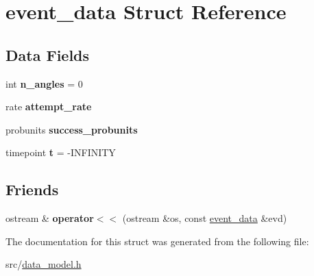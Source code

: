 \hypertarget{structevent__data}{}\section{event\+\_\+data Struct Reference}
\label{structevent__data}
\subsection*{Data Fields}
\begin{DoxyCompactItemize}
\item 
int {\bfseries n\+\_\+angles} = 0\hypertarget{structevent__data_a4ac8163657589d149ed034f321b61ce9}{}\label{structevent__data_a4ac8163657589d149ed034f321b61ce9}

\item 
rate {\bfseries attempt\+\_\+rate}\hypertarget{structevent__data_aa12da1e46a4e8e401433e90fd97fc015}{}\label{structevent__data_aa12da1e46a4e8e401433e90fd97fc015}

\item 
probunits {\bfseries success\+\_\+probunits}\hypertarget{structevent__data_ae13f0249bae2966da48518074f2b3495}{}\label{structevent__data_ae13f0249bae2966da48518074f2b3495}

\item 
timepoint {\bfseries t} = -\/I\+N\+F\+I\+N\+I\+TY\hypertarget{structevent__data_aa2f4362fb8d987420d6941e29cb50710}{}\label{structevent__data_aa2f4362fb8d987420d6941e29cb50710}

\end{DoxyCompactItemize}
\subsection*{Friends}
\begin{DoxyCompactItemize}
\item 
ostream \& {\bfseries operator$<$$<$} (ostream \&os, const \hyperlink{structevent__data}{event\+\_\+data} \&evd)\hypertarget{structevent__data_a39ddcc1bb1a2d01e9868f33afdb1beba}{}\label{structevent__data_a39ddcc1bb1a2d01e9868f33afdb1beba}

\end{DoxyCompactItemize}


The documentation for this struct was generated from the following file\+:\begin{DoxyCompactItemize}
\item 
src/\hyperlink{data__model_8h}{data\+\_\+model.\+h}\end{DoxyCompactItemize}
